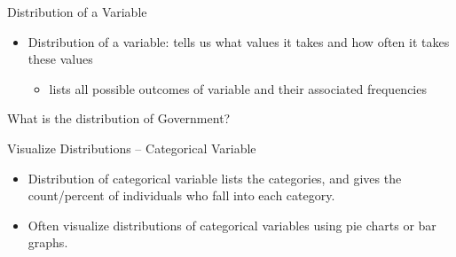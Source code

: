 \documentclass{beamer}
\begin{document}
\begin{frame}{Distribution of a Variable}
    \begin{itemize}
        \item \alert{Distribution of a variable}: tells us what values it takes and how often it takes these values
            \begin{itemize}
                \item lists all possible outcomes of variable and their associated frequencies
            \end{itemize}
        \end{itemize}

        \begin{center}
            \end{center}
        What is the distribution of  Government? 
\end{frame}

\begin{frame}{Visualize Distributions -- Categorical Variable}
    \begin{itemize}
        \item Distribution of categorical variable lists the categories, and gives the count/percent of individuals who fall into each category.
        
        \item Often visualize distributions of categorical variables using \alert{pie charts} or \alert{bar graphs}.
    \end{itemize}
\end{frame}
\end{document}
